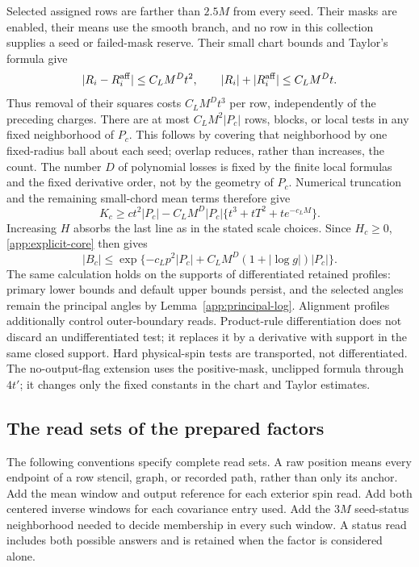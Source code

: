 Selected assigned rows are farther than $2.5M$ from every seed.  Their
masks are enabled, their means use the smooth branch, and no row in
this collection supplies a seed or failed-mask reserve.  Their small
chart bounds and Taylor's formula give
\[
 |R_i-R_i^{\rm aff}|\le C_LM^Dt^2,
 \qquad |R_i|+|R_i^{\rm aff}|\le C_LM^Dt.
\]
Thus removal of their squares costs $C_LM^Dt^3$ per row, independently
of the preceding charges.  There are at most $C_LM^2|P_c|$ rows,
blocks, or local tests in any fixed neighborhood of $P_c$.  This
follows by covering that neighborhood by one fixed-radius ball about
each seed; overlap reduces, rather than increases, the count.  The
number $D$ of polynomial losses is fixed by the finite local formulas
and the fixed derivative order, not by the geometry of $P_c$.
Numerical truncation and the remaining small-chord mean terms therefore
give
\[
 K_c\ge c t^2|P_c|
 -C_LM^D|P_c|\{t^3+tT^2+te^{-c_LM}\}.
\]
Increasing $H$ absorbs the last line as in the stated scale choices.
Since $H_c\ge0$, \eqref{app:explicit-core} then gives
\[
 |B_c|\le
 \exp\{-c_Lp^2|P_c|+C_LM^D(1+|\log g|)|P_c|\}.
\]
The same calculation holds on the supports of differentiated retained
profiles: primary lower bounds and default upper bounds persist,
and the selected angles remain the principal angles by
Lemma~\ref{app:principal-log}.  Alignment profiles additionally control
outer-boundary reads.  Product-rule differentiation does not discard an
undifferentiated test; it replaces it by a derivative with support in
the same closed support.  Hard physical-spin tests are transported,
not differentiated.  The no-output-flag extension uses the positive-mask,
unclipped formula through $4t'$; it changes only the fixed constants in
the chart and Taylor estimates.

\subsection{The read sets of the prepared factors}
\label{app:read-sets}

The following conventions specify complete read sets.  A raw position
means every endpoint of a row stencil, graph, or recorded path, rather
than only its anchor.  Add the mean window and output reference for each
exterior spin read.  Add both centered inverse windows for each covariance
entry used.  Add the $3M$ seed-status neighborhood needed to decide
membership in every such window.  A status read includes both possible
answers and is retained when the factor is considered alone.

